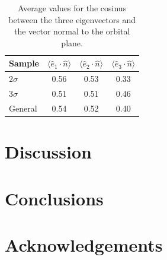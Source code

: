 \documentclass{emulateapj}
\begin{document}
\begin{table}
\begin{center}
\begin{tabular}{lccc}\hline\hline
Sample & $\langle\hat{e}_1\cdot \hat{n}\rangle$ & $\langle\hat{e}_2\cdot \hat{n}\rangle$ & $\langle\hat{e}_3\cdot \hat{n}\rangle$\\\hline
2$\sigma$ & 0.56 & 0.53 &  0.33\\
3$\sigma$ & 0.51 & 0.51 &  0.46\\
General & 0.54 & 0.52 & 0.40\\\hline
\end{tabular}
\caption{Average values for the cosinus between the three eigenvectors and the vector normal to the orbital plane.
\label{table:mu}}
\end{center}
\end{table}




\section{Discussion}
\label{sec:discussion}

\section{Conclusions}
\label{sec:conclusions}


\section*{Acknowledgements}


 
\end{document}
